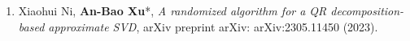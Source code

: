 \documentclass[12pt,a4paper,utf8]{moderncv}
\begin{document}
\begin{enumerate}
\item Xiaohui Ni, \textbf{An-Bao Xu}*,  \emph{A randomized algorithm for a QR decomposition-based approximate SVD}, arXiv preprint arXiv: arXiv:2305.11450  (2023).




\end{enumerate}
\end{document}
